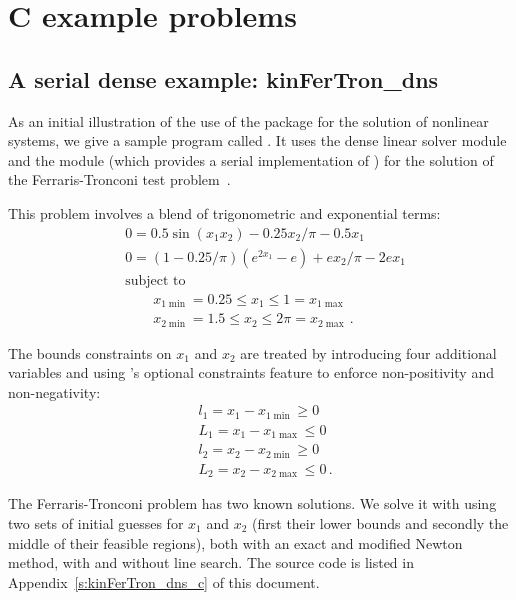 \section{C example problems}\label{s:ex_c}

\subsection{A serial dense example: kinFerTron\_dns}\label{ss:kinFerTron_dns}

As an initial illustration of the use of the {\kinsol} package for the
solution of nonlinear systems, we give a sample program called .
It uses the {\kinsol} dense linear solver module {\kindense} 
and the {\nvecs} module (which provides a serial implementation of {\nvector})
for the solution of the Ferraris-Tronconi test problem~\cite{FlPa:99}.

This problem involves a blend of trigonometric and exponential terms:
\begin{equation}
\begin{split}
  & 0 = 0.5 \sin(x_1 x_2) - 0.25 x_2/\pi - 0.5 x_1 \\
  & 0 = (1-0.25/\pi) ( e^{2 x_1} - e ) + e x_2 / \pi - 2 e x_1 \\
  &\text{subject to } \\
  &\qquad x_{1\min} = 0.25 \le x_1 \le 1 = x_{1\max} \\
  &\qquad x_{2\min} = 1.5 \le x_2 \le 2\pi = x_{2\max} \, .
\end{split}
\end{equation}

The bounds constraints on $x_1$ and $x_2$ are treated by introducing
four additional variables and using {\kinsol}'s optional constraints
feature to enforce non-positivity and non-negativity:
\begin{equation*}
\begin{split}
  &l_1 = x_1 - x_{1\min} \ge 0\\
  &L_1 = x_1 - x_{1\max} \le 0\\
  &l_2 = x_2 - x_{2\min} \ge 0\\
  &L_2 = x_2 - x_{2\max} \le 0 \, .
\end{split}
\end{equation*}

The Ferraris-Tronconi problem has two known solutions. We solve it with
{\kinsol} using two sets of initial guesses for $x_1$ and $x_2$ (first their 
lower bounds and secondly the middle of their feasible regions), both with
an exact and modified Newton method, with and without line search.
The source code is listed in Appendix~\ref{s:kinFerTron_dns_c} of this document.

